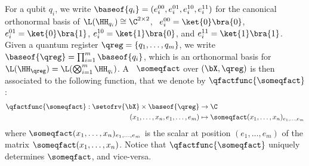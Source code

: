 For a qubit $q_i$, we write $\baseof{q_i} = (e^{00}_i,e^{01}_i,e^{10}_i,e^{11}_i)$ for the canonical orthonormal basis of $\L(\HH_{q_i}) \cong \C^{2\times 2}$, \ie\ $e^{00}_i = \ket{0}\bra{0}$, $e^{01}_i = \ket{0}\bra{1}$, $e^{10}_i = \ket{1}\bra{0}$, and $e^{11}_i = \ket{1}\bra{1}$.
Given a quantum register $\qreg = \{q_1, \dots, q_m\}$, we write $\baseof{\qreg} = \prod_{i=1}^m\baseof{q_i}$, which is an orthonormal basis for $\L(\HH_\qreg) = \L(\bigotimes_{i=1}^m \HH_{q_i})$.
A \qfactor\ $\someqfact$ over $(\bX,\qreg)$ is then associated to the following function, that we denote by $\qfactfunc{\someqfact}$:
\begin{align*}
\qfactfunc{\someqfact}: \setofrv{\bX} \times \baseof{\qreg} &\to \C\\
(x_1,\dots,x_n,e_1,\dots,e_m)&\mapsto \someqfact(x_1,\dots,x_n)_{e_1,\dots,e_m}
\end{align*}
where $\someqfact(x_1,\dots,x_n)_{e_1,\dots,e_m}$ is the scalar at position $(e_1,\dots,e_m)$ of the matrix $\someqfact(x_1,\dots,x_n)$.
Notice that $\qfactfunc{\someqfact}$ uniquely determines $\someqfact$, and vice-versa.

